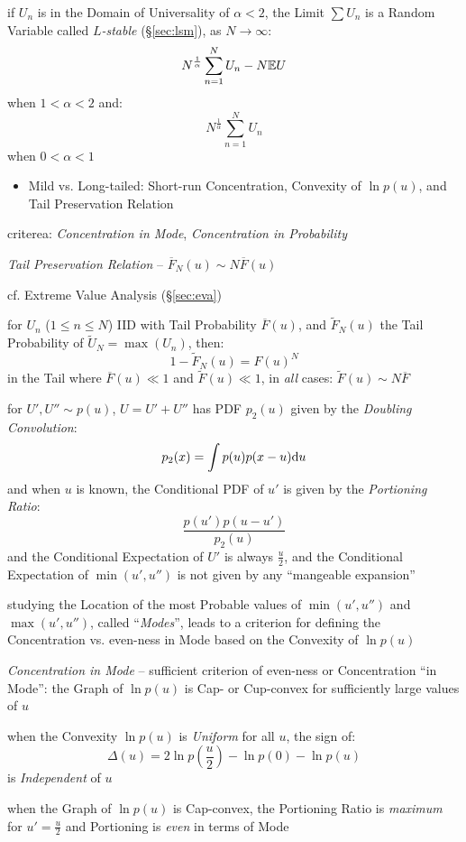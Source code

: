 if $U_n$ is in the Domain of Universality of $\alpha < 2$, the Limit $\sum U_n$
is a Random Variable called \emph{$L$-stable} (\S\ref{sec:lsm}), as
$N \to \infty$:
\[
  N^\frac{1}{\alpha} \sum_{n=1}^N U_n - N \mathbb{E}{U}
\]
when $1 < \alpha < 2$ and:
\[
  N^\frac{1}{\alpha} \sum_{n=1}^N U_n
\]
when $0 < \alpha < 1$

\begin{itemize}
  \item Mild vs. Long-tailed: Short-run Concentration, Convexity of $\ln p(u)$,
    and Tail Preservation Relation
\end{itemize}

criterea: \emph{Concentration in Mode}, \emph{Concentration in Probability}

\emph{Tail Preservation Relation} -- $\overline{F}_N(u) \sim N \overline{F}(u)$

cf. Extreme Value Analysis (\S\ref{sec:eva})

for $U_n$ ($1 \leq n \leq N$) IID with Tail Probability $\overline{F}(u)$, and
$\tilde{F}_N(u)$ the Tail Probability of $\tilde{U}_N = \max(U_n)$, then:
\[
  1 - \tilde{F}_N(u) = F(u)^N
\]
in the Tail where $\overline{F}(u) \ll 1$ and $\tilde{F}(u) \ll 1$, in
\emph{all} cases: $\tilde{F}(u) \sim N \overline{F}$

for $U', U'' \sim p(u)$, $U = U' + U''$ has PDF $p_2(u)$ given by the
\emph{Doubling Convolution}:
\[
  p_2(x) = \int p(u) p(x - u) \mathrm{d}u
\]
and when $u$ is known, the Conditional PDF of $u'$ is given by the
\emph{Portioning Ratio}:
\[
  \frac{p(u') p(u - u')}{p_2(u)}
\]
and the Conditional Expectation of $U'$ is always $\frac{u}{2}$, and the
Conditional Expectation of $\min(u', u'')$ is not given by any ``mangeable
expansion''

studying the Location of the most Probable values of $\min(u', u'')$ and
$\max(u', u'')$, called ``\emph{Modes}'', leads to a criterion for defining the
Concentration vs. even-ness in Mode based on the Convexity of $\ln p(u)$

\emph{Concentration in Mode} -- sufficient criterion of even-ness or
Concentration ``in Mode'': the Graph of $\ln p(u)$ is Cap- or Cup-convex for
sufficiently large values of $u$

when the Convexity $\ln p(u)$ is \emph{Uniform} for all $u$, the sign of:
\[
  \Delta(u) = 2 \ln p(\frac{u}{2}) - \ln p(0) - \ln p(u)
\]
is \emph{Independent} of $u$

when the Graph of $\ln p(u)$ is Cap-convex, the Portioning Ratio is
\emph{maximum} for $u' = \frac{u}{2}$ and Portioning is \emph{even} in terms of
Mode

